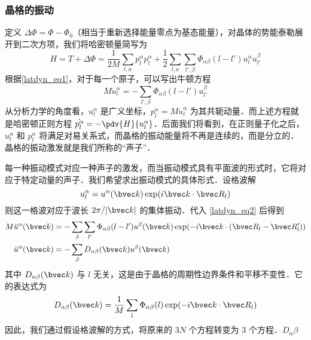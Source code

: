 \subsubsection{晶格的振动}
定义 $\Delta \Phi=\Phi-\Phi_0$（相当于重新选择能量零点为基态能量），对晶体的势能泰勒展开到二次方项，我们将哈密顿量简写为
\begin{equation}
H=T+\Delta \Phi=\frac{1}{2M}\sum_{l,\alpha}p_l^\alpha p_l^\alpha + \frac{1}{2}\sum_{l,a}\sum_{l',\beta}\Phi_{\alpha\beta}(l-l')u_l^\alpha u_{l'}^\beta
\end{equation}
根据\autoref{latdyn_eq1}，对于每一个原子，可以写出牛顿方程
\begin{equation}\label{latdyn_eq2}
M \ddot{u}_l^\alpha = -\sum_{l',\beta}\Phi_{\alpha\beta}(l-l')u_{l'}^\beta
\end{equation}
从分析力学的角度看，$u_l^\alpha$ 是广义坐标，$p_l^\alpha=M\dot{u}_l^\alpha$ 为其共轭动量．而上述方程就是哈密顿正则方程 $\dot{p_l^\alpha}=-\pdv{H}{u_l^\alpha}$．后面我们将看到，在正则量子化之后，$u_l^\alpha$ 和 $p_l^\alpha$ 将满足对易关系式，而晶格的振动能量将不再是连续的，而是分立的．晶格的振动激发就是我们所称的“声子”．

每一种振动模式对应一种声子的激发，而当振动模式具有平面波的形式时，它将对应于特定动量的声子．我们希望求出振动模式的具体形式．设格波解
\begin{equation}
u_l^\alpha = u^\alpha(\bvec k) \exp(i\bvec k\cdot \bvec R_l)
\end{equation}
则这一格波对应于波长 $2\pi/|\bvec k|$ 的集体振动．代入 \autoref{latdyn_eq2} 后得到
\begin{equation}
\begin{aligned}
M\ddot{u}^\alpha(\bvec k)&=-\sum_{\beta}\sum_{l'}\Phi_{\alpha\beta}(l-l')u^\beta(\bvec k)\exp(-i\bvec k\cdot(\bvec R_l-\bvec R_l'))\\
\ddot{u}^\alpha(\bvec k)&=-\sum_{\beta}D_{\alpha\beta}(\bvec k)u^\beta(\bvec k)
\end{aligned}
\end{equation}
其中 $D_{\alpha\beta}(\bvec k)$ 与 $l$ 无关，这是由于晶格的周期性边界条件和平移不变性．它的表达式为
\begin{equation}
D_{\alpha\beta}(\bvec k)=\frac{1}{M}\sum_l \Phi_{\alpha\beta}(l)\exp(-i\bvec k\cdot \bvec R_l)
\end{equation}
因此，我们通过假设格波解的方式，将原来的 $3N$ 个方程转变为 $3$ 个方程．$D_\alpha\beta$
